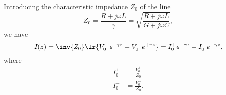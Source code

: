 Introducing the characteristic impedance \( Z_0 \) of the line
\begin{dmath}\label{eqn:uwaves4TransmissionLines:260}
Z_0
= \frac{R + j \omega L}{\gamma}
= \sqrt{ \frac{R + j \omega L}{G + j \omega C} },
\end{dmath}
we have
\begin{dmath}\label{eqn:uwaves4TransmissionLines:280}
I(z)
=
\inv{Z_0} \lr{ V_0^{+} e^{-\gamma z} - V_0^{-} e^{+\gamma z} }
=
I_0^{+} e^{-\gamma z} - I_0^{-} e^{+\gamma z},
\end{dmath}
where
\begin{equation}\label{eqn:uwaves4TransmissionLines:300}
\begin{aligned}
I_0^{+} &= \frac{V_0^{+}}{Z_0} \\
I_0^{-} &= \frac{V_0^{-}}{Z_0}.
\end{aligned}
\end{equation}
